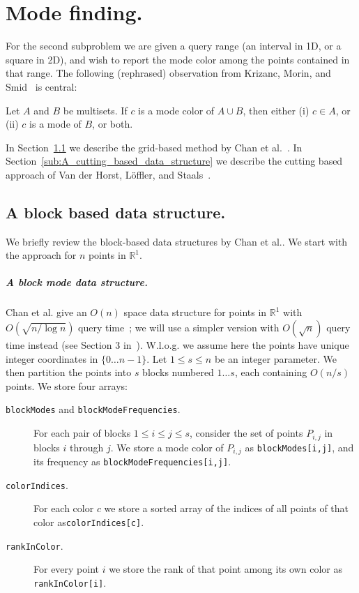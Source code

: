 \documentclass[twoside,leqno,twocolumn]{article}
\newcommand{\R} {\mathbb{R}\xspace}
\newcommand{\etal}{et al.\xspace}
\begin{document}
\section{Mode finding.}
\label{sec:Mode_finding}

For the second subproblem we are given a query range (an interval in
1D, or a square in 2D), and wish to report the mode color among the
points contained in that range. The following (rephrased) observation
from Krizanc, Morin, and Smid~\cite{krizanc2005modeSets} is central:

\begin{lemma}
  \label{lem:modeColors}
Let $A$ and $B$ be multisets. If $c$ is a mode color of $A \cup B$, then either (i) $c \in A$, or (ii) $c$ is a mode of $B$, or both.
\end{lemma}

In Section~\ref{sub:A_grid_based_data_structure} we describe the grid-based method by
Chan \etal~\cite{chan2014modeQuery}. In Section~\ref{sub:A_cutting_based_data_structure} we
describe the cutting based approach of Van der Horst, Löffler, and
Staals~\cite{chromatic_knn2025}.


\subsection{A block based data structure.}
\label{sub:A_grid_based_data_structure}
We briefly review the block-based data structures by Chan \etal. We
start with the approach for $n$ points in $\R^1$.

\subparagraph{A block mode data structure.} Chan \etal give an $O(n)$
space data structure for points in $\R^1$ with $O(\sqrt{n / \log n})$
query time~\cite{chan2014modeQuery}; we will use a simpler version
with $O(\sqrt{n})$ query time instead (see Section 3
in~\cite{chan2014modeQuery}). W.l.o.g. we assume here the points have
unique integer coordinates in $\{ 0 \dots n-1 \}$. Let
$1 \leq s \leq n$ be an integer parameter. We then partition the
points into $s$ blocks numbered $1 \ldots s$, each containing $O(n/s)$
points. We store four arrays:

\begin{description}
\item[\texttt{blockModes} and \texttt{blockModeFrequencies}.] For each
  pair of blocks $1 \leq i \leq j \leq s$, consider the set of points $P_{i,j}$ in blocks $i$ through $j$. We store a mode color of $P_{i,j}$ as
  \texttt{blockModes[i,j]}, and its frequency as
  \texttt{blockModeFrequencies[i,j]}.
\item[\texttt{colorIndices}.] For each color $c$ we store a sorted array of the indices of all points of that color as\texttt{colorIndices[c]}.
\item[\texttt{rankInColor}.] For every point $i$ we store the rank of that point among its own color as \texttt{rankInColor[i]}.
\end{description}
\end{document}
